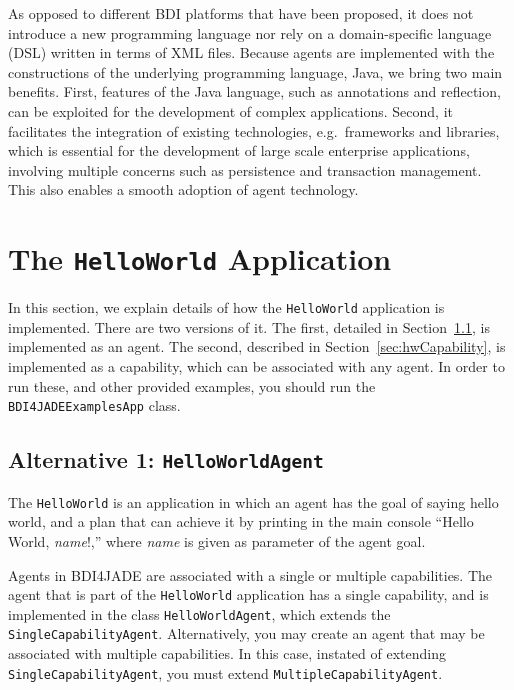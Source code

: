 \documentclass{article}
\begin{document}
As opposed to different BDI platforms that have been proposed, it does not introduce a new programming language nor rely on a domain-specific language (DSL) written in terms of XML files. Because agents are implemented with the constructions of the underlying programming language, Java, we bring two main benefits. First, features of the Java language, such as annotations and reflection, can be exploited for the development of complex applications. Second, it facilitates the integration of existing technologies, e.g.\ frameworks and libraries, which is essential for the development of large scale enterprise applications, involving multiple concerns such as persistence and transaction management. This also enables a smooth adoption of agent technology.

\section{The \texttt{HelloWorld} Application}\label{section:helloWorld}

In this section, we explain details of how the \texttt{HelloWorld} application is implemented. There are two versions of it. The first, detailed in Section~\ref{sec:hwAgent}, is implemented as an agent. The second, described in Section~\ref{sec:hwCapability}, is implemented as a capability, which can be associated with any agent. In order to run these, and other provided examples, you should run the \texttt{BDI4JADEExamplesApp} class.

\subsection{Alternative 1: \texttt{HelloWorldAgent}}\label{sec:hwAgent}

The \texttt{HelloWorld} is an application in which an agent has the goal of saying hello world, and a plan that can achieve it by printing in the main console ``Hello World, \emph{name}!,'' where \emph{name} is given as parameter of the agent goal.

Agents in BDI4JADE are associated with a single or multiple capabilities. The agent that is part of the \texttt{HelloWorld} application has a single capability, and is implemented in the class \texttt{HelloWorldAgent}, which extends the \texttt{SingleCapabilityAgent}. Alternatively, you may create an agent that may be associated with multiple capabilities. In this case, instated of extending \texttt{SingleCapabilityAgent}, you must extend \texttt{MultipleCapabilityAgent}.
\end{document}
